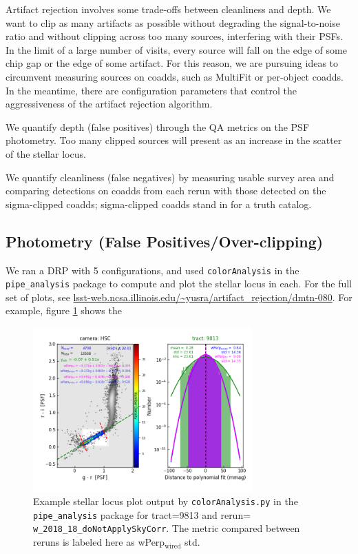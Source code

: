 \documentclass[DM,authoryear,toc]{lsstdoc}
\begin{document}
Artifact rejection involves some trade-offs between cleanliness and depth.
We want to clip as many artifacts as possible  without degrading the signal-to-noise ratio and without clipping across too many sources, interfering with their PSFs.
In the limit of a large number of visits,   every source will fall on the edge of some chip gap or the edge of some artifact. For this reason, we are pursuing ideas to circumvent measuring sources on coadds, such as MultiFit or per-object coadds.
In the meantime, there are configuration parameters that control the aggressiveness of the artifact rejection algorithm.

We quantify depth (false positives) through the QA metrics on the PSF photometry.
Too many clipped sources will present as an increase in the scatter of the stellar locus.

We quantify cleanliness (false negatives) by measuring usable survey area and comparing detections on coadds from each rerun with those detected on the sigma-clipped coadds; sigma-clipped coadds stand in for a truth catalog.


\subsection{Photometry (False Positives/Over-clipping)}

We ran a DRP with 5 configurations, and used \texttt{colorAnalysis} in the  \texttt{pipe\_analysis} package to compute and plot the stellar locus in each. For the full set of plots, see \url{lsst-web.ncsa.illinois.edu/~yusra/artifact_rejection/dmtn-080}.
For example, figure \ref{fig:wFit} shows the
\begin{figure}
\begin{centering}
\includegraphics[width=0.75\textwidth]{figures/plot-t9813-griPSF-wFit-fit.png}
\par\end{centering}
\caption{\label{fig:wFit}  Example stellar locus plot output by \texttt{colorAnalysis.py} in the \texttt{pipe\_analysis} package for tract=9813 and rerun= \texttt{w\_2018\_18\_doNotApplySkyCorr}. The metric compared between reruns is labeled here as wPerp$_\mathrm{wired}$ std. }
\end{figure}
\end{document}

